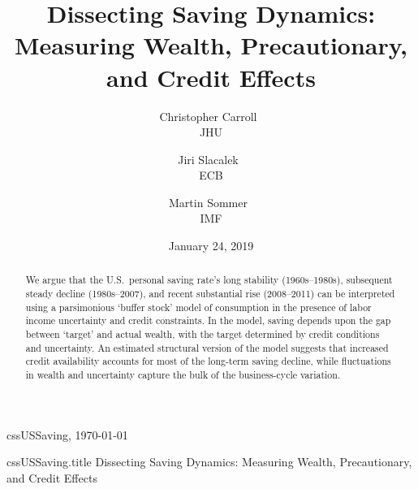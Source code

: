\documentclass[titlepage]{\econtex}
\providecommand{\texname}{cssUSSaving}%
\begin{document}

\hfill{\tiny \texname, \today}

\begin{verbatimwrite}{\texname.title}
Dissecting Saving Dynamics: Measuring Wealth, Precautionary, and Credit Effects
\end{verbatimwrite}

\title{Dissecting Saving Dynamics: Measuring Wealth, Precautionary, and Credit Effects  }

\medskip\medskip

\author{
{Christopher Carroll\tiny{~}}\authNum \\ {\small JHU}
\and
{Jiri Slacalek\tiny{~}}\authNum \\ {\small ECB}
\and
{Martin Sommer\tiny{~}}\authNum \\ {\small IMF}
}

\date{January 24, 2019}

\maketitle




\begin{abstract}
  We argue that the U.S.\
  personal saving rate's long stability (1960s--1980s), subsequent
  steady decline (1980s--2007), and recent substantial rise
  (2008--2011) can be interpreted using a parsimonious `buffer stock'
  model of consumption in the presence of labor income uncertainty and
  credit constraints. In the model, saving depends upon the gap
  between `target' and actual wealth, with the target determined by
  credit conditions and uncertainty.  An estimated structural version
  of the model suggests that increased credit availability accounts
  for most of the long-term saving decline, while fluctuations in
  wealth and uncertainty capture the bulk of the business-cycle
  variation.
\end{abstract}
\end{document}
